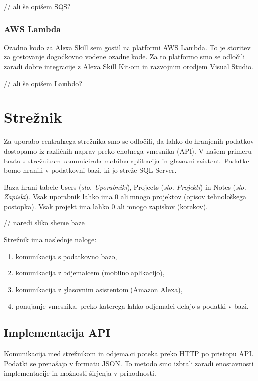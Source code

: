 \documentclass[a4paper, 12pt]{book}
\begin{document}
// ali še opišem SQS?

\subsubsection{AWS Lambda}

Ozadno kodo za Alexa Skill sem gostil na platformi AWS Lambda.
To je storitev za gostovanje dogodkovno vodene ozadne kode.
Za to platformo smo se odločili zaradi dobre integracije z Alexa Skill Kit-om in razvojnim orodjem Visual Studio.

// ali še opišem Lambdo?


\section{Strežnik}

Za uporabo centralnega strežnika smo se odločili, da lahko do hranjenih podatkov dostopamo iz različnih naprav preko enotnega vmesnika (API).
V našem primeru bosta s strežnikom komunicirala mobilna aplikacija in glasovni asistent.
Podatke bomo hranili v podatkovni bazi, ki jo streže SQL Server.

Baza hrani tabele Users (\textit{slo. Uporabniki}), Projects (\textit{slo. Projekti}) in Notes (\textit{slo. Zapiski}).
Vsak uporabnik lahko ima 0 ali mnogo projektov (opisov tehnološkega postopka).
Vsak projekt ima lahko 0 ali mnogo zapiskov (korakov).

// naredi sliko sheme baze

\noindent Strežnik ima naslednje naloge:
\begin{enumerate}
	\item komunikacija s podatkovno bazo,
	\item komunikacija z odjemalcem (mobilno aplikacijo),
	\item komunikacija z glasovnim asistentom (Amazon Alexa),
	\item ponujanje vmesnika, preko katerega lahko odjemalci delajo s podatki v bazi.
\end{enumerate}


\subsection{Implementacija API}

Komunikacija med strežnikom in odjemalci poteka preko HTTP po pristopu API.
Podatki se prenašajo v formatu JSON.
To metodo smo izbrali zaradi enostavnosti implementacije in možnosti širjenja v prihodnosti.
\end{document}
